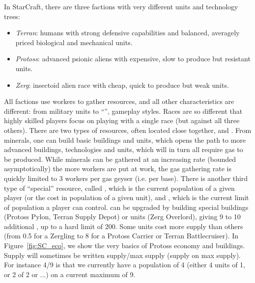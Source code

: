 In StarCraft, there are three factions with very different units and technology trees:
\begin{itemize}
    \item \textit{Terran}: humans with strong defensive capabilities and balanced, averagely priced biological and mechanical units.
    \item \textit{Protoss}: advanced psionic aliens with expensive, slow to produce but resistant units.
    \item \textit{Zerg}: insectoid alien race with cheap, quick to produce but weak units.
\end{itemize}

All factions use workers to gather resources, and all other characteristics are different: from military units to ``'', gameplay styles. Races are so different that highly skilled players focus on playing with a single race (but against all three others). There are two types of resources, often located close together,  and . From minerals, one can build basic buildings and units, which opens the path to more advanced buildings, technologies and units, which will in turn all require gas to be produced. While minerals can be gathered at an increasing rate (bounded asymptotically) the more workers are put at work, the gas gathering rate is quickly limited to 3 workers per gas geyser (i.e. per base). There is another third type of ``special'' resource, called \textit{}, which is the current population of a given player (or the cost in population of a given unit), and \textit{}, which is the current limit of population a player can control.  can be upgraded by building special buildings (Protoss Pylon, Terran Supply Depot) or units (Zerg Overlord), giving 9 to 10 additional , up to a hard limit of 200. Some units cost more supply than others (from 0.5 for a Zergling to 8 for a Protoss Carrier or Terran Battlecruiser). In Figure~\ref{fig:SC_eco}, we show the very basics of Protoss economy and buildings. Supply will sometimes be written supply/max supply (supply on max supply). For instance 4/9 is that we currently have a population of 4 (either 4 units of 1, or 2 of 2 or ...) on a current maximum of 9. %

